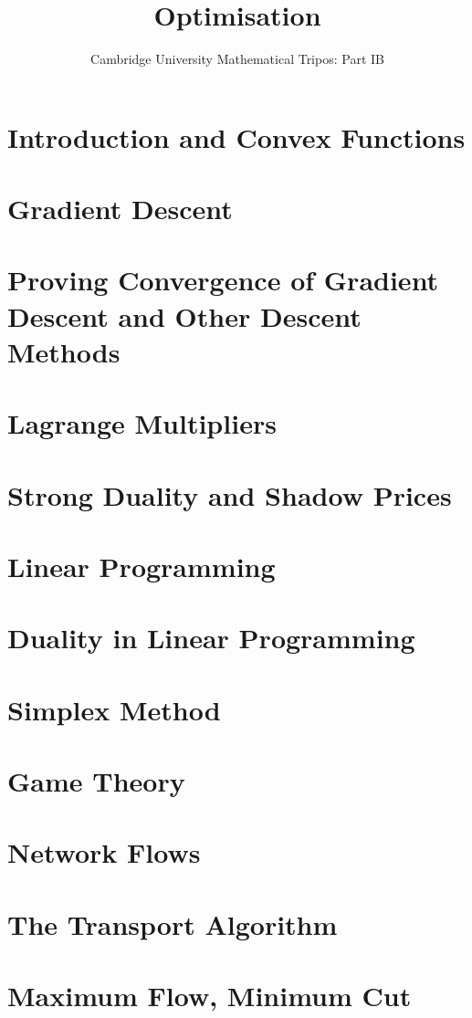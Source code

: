 \documentclass{article}
\title{Optimisation}
\author{Cambridge University Mathematical Tripos: Part IB}
\begin{document}
\maketitle

\tableofcontentsnewpage{}

\section{Introduction and Convex Functions}

\section{Gradient Descent}

\section{Proving Convergence of Gradient Descent and Other Descent Methods}

\section{Lagrange Multipliers}

\section{Strong Duality and Shadow Prices}

\section{Linear Programming}

\section{Duality in Linear Programming}

\section{Simplex Method}

\section{Game Theory}

\section{Network Flows}

\section{The Transport Algorithm}

\section{Maximum Flow, Minimum Cut}

\end{document}

